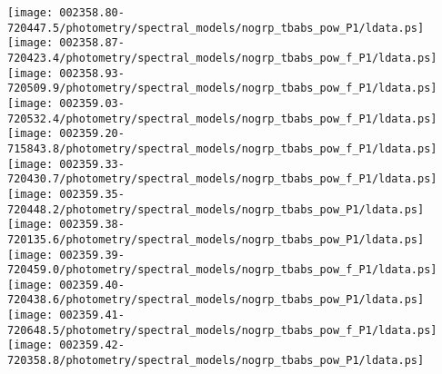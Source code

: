 \documentclass{aastex}
\begin{document}
\begin{figure*}[!ht]
\centering
\texttt{[image: 002358.80-720447.5/photometry/spectral\_models/nogrp\_tbabs\_pow\_P1/ldata.ps]} \hfill 
\texttt{[image: 002358.87-720423.4/photometry/spectral\_models/nogrp\_tbabs\_pow\_f\_P1/ldata.ps]} \hfill 
\texttt{[image: 002358.93-720509.9/photometry/spectral\_models/nogrp\_tbabs\_pow\_f\_P1/ldata.ps]} \\ 
\vspace*{0.5in}
\texttt{[image: 002359.03-720532.4/photometry/spectral\_models/nogrp\_tbabs\_pow\_f\_P1/ldata.ps]} \hfill 
\texttt{[image: 002359.20-715843.8/photometry/spectral\_models/nogrp\_tbabs\_pow\_f\_P1/ldata.ps]} \hfill 
\texttt{[image: 002359.33-720430.7/photometry/spectral\_models/nogrp\_tbabs\_pow\_f\_P1/ldata.ps]} \\ 
\vspace*{0.5in}
\texttt{[image: 002359.35-720448.2/photometry/spectral\_models/nogrp\_tbabs\_pow\_P1/ldata.ps]} \hfill 
\texttt{[image: 002359.38-720135.6/photometry/spectral\_models/nogrp\_tbabs\_pow\_P1/ldata.ps]} \hfill 
\texttt{[image: 002359.39-720459.0/photometry/spectral\_models/nogrp\_tbabs\_pow\_f\_P1/ldata.ps]} \\ 
\vspace*{0.5in}
\texttt{[image: 002359.40-720438.6/photometry/spectral\_models/nogrp\_tbabs\_pow\_P1/ldata.ps]} \hfill 
\texttt{[image: 002359.41-720648.5/photometry/spectral\_models/nogrp\_tbabs\_pow\_f\_P1/ldata.ps]} \hfill 
\texttt{[image: 002359.42-720358.8/photometry/spectral\_models/nogrp\_tbabs\_pow\_P1/ldata.ps]} \\ 
\vspace*{0.5in}
\end{figure*}
\clearpage
\end{document}
